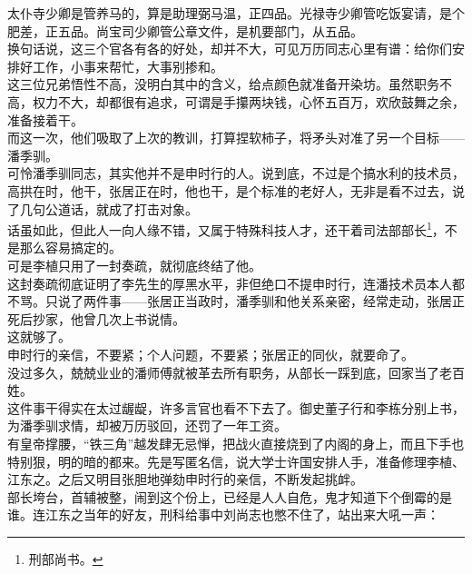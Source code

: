 \begin{multicols}{\theparacolNo}
太仆寺少卿是管养马的，算是助理弼马温，正四品。光禄寺少卿管吃饭宴请，是个肥差，正五品。尚宝司少卿管公章文件，是机要部门，从五品。\\

换句话说，这三个官各有各的好处，却并不大，可见万历同志心里有谱：给你们安排好工作，小事来帮忙，大事别掺和。\\

这三位兄弟悟性不高，没明白其中的含义，给点颜色就准备开染坊。虽然职务不高，权力不大，却都很有追求，可谓是手攥两块钱，心怀五百万，欢欣鼓舞之余，准备接着干。\\

而这一次，他们吸取了上次的教训，打算捏软柿子，将矛头对准了另一个目标——潘季驯。\\

可怜潘季驯同志，其实他并不是申时行的人。说到底，不过是个搞水利的技术员，高拱在时，他干，张居正在时，他也干，是个标准的老好人，无非是看不过去，说了几句公道话，就成了打击对象。\\

话虽如此，但此人一向人缘不错，又属于特殊科技人才，还干着司法部部长\footnote{刑部尚书。}，不是那么容易搞定的。\\

可是李植只用了一封奏疏，就彻底终结了他。\\

这封奏疏彻底证明了李先生的厚黑水平，非但绝口不提申时行，连潘技术员本人都不骂。只说了两件事——张居正当政时，潘季驯和他关系亲密，经常走动，张居正死后抄家，他曾几次上书说情。\\

这就够了。\\

申时行的亲信，不要紧；个人问题，不要紧；张居正的同伙，就要命了。\\

没过多久，兢兢业业的潘师傅就被革去所有职务，从部长一踩到底，回家当了老百姓。\\

这件事干得实在太过龌龊，许多言官也看不下去了。御史董子行和李栋分别上书，为潘季驯求情，却被万历驳回，还罚了一年工资。\\

有皇帝撑腰，“铁三角”越发肆无忌惮，把战火直接烧到了内阁的身上，而且下手也特别狠，明的暗的都来。先是写匿名信，说大学士许国安排人手，准备修理李植、江东之。之后又明目张胆地弹劾申时行的亲信，不断发起挑衅。\\

部长垮台，首辅被整，闹到这个份上，已经是人人自危，鬼才知道下个倒霉的是谁。连江东之当年的好友，刑科给事中刘尚志也憋不住了，站出来大吼一声：\\


\end{multicols}
